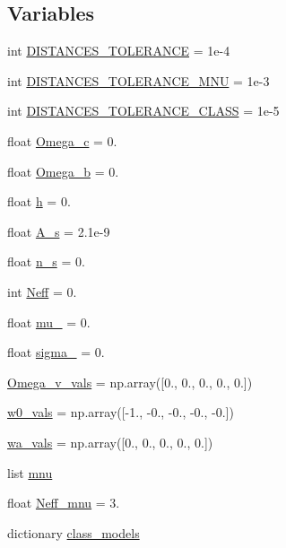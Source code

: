 \subsection*{Variables}
\begin{DoxyCompactItemize}
\item 
int \mbox{\hyperlink{namespaceccl__test__distances_a24d703f3624b8dbed19048286420f986}{D\+I\+S\+T\+A\+N\+C\+E\+S\+\_\+\+T\+O\+L\+E\+R\+A\+N\+CE}} = 1e-\/4
\item 
int \mbox{\hyperlink{namespaceccl__test__distances_a5f8c7c48eb6f00fecddfacef60daece3}{D\+I\+S\+T\+A\+N\+C\+E\+S\+\_\+\+T\+O\+L\+E\+R\+A\+N\+C\+E\+\_\+\+M\+NU}} = 1e-\/3
\item 
int \mbox{\hyperlink{namespaceccl__test__distances_a1ca232f4f29884f49cac06c8238573fd}{D\+I\+S\+T\+A\+N\+C\+E\+S\+\_\+\+T\+O\+L\+E\+R\+A\+N\+C\+E\+\_\+\+C\+L\+A\+SS}} = 1e-\/5
\item 
float \mbox{\hyperlink{namespaceccl__test__distances_af043eb3c72e09eb5d61c07d8ae053b23}{Omega\+\_\+c}} = 0.
\item 
float \mbox{\hyperlink{namespaceccl__test__distances_ab9ebb83b3405642c411447bff8d1cdfa}{Omega\+\_\+b}} = 0.
\item 
float \mbox{\hyperlink{namespaceccl__test__distances_a6657d9200f3deee33876fcfbe909ad0b}{h}} = 0.
\item 
float \mbox{\hyperlink{namespaceccl__test__distances_a4fee99b90c7ad9e42ac56246005f2f99}{A\+\_\+s}} = 2.\+1e-\/9
\item 
float \mbox{\hyperlink{namespaceccl__test__distances_abad4b55ea71dc4c136de2741294d10f3}{n\+\_\+s}} = 0.
\item 
int \mbox{\hyperlink{namespaceccl__test__distances_a23a5c8a12ec37f9ca3d0dc89fe1ae297}{Neff}} = 0.
\item 
float \mbox{\hyperlink{namespaceccl__test__distances_abc8984952fe15413ffa2455954c99084}{mu\+\_}} = 0.
\item 
float \mbox{\hyperlink{namespaceccl__test__distances_a24a6625698e8ac04b4cb42e2eecec798}{sigma\+\_}} = 0.
\item 
\mbox{\hyperlink{namespaceccl__test__distances_a12765193e04eba1a445ea1429b656ef8}{Omega\+\_\+v\+\_\+vals}} = np.\+array(\mbox{[}0., 0., 0., 0., 0.\mbox{]})
\item 
\mbox{\hyperlink{namespaceccl__test__distances_a3cd2fd2656b01e8fa9d3b3b1905570b4}{w0\+\_\+vals}} = np.\+array(\mbox{[}-\/1., -\/0., -\/0., -\/0., -\/0.\mbox{]})
\item 
\mbox{\hyperlink{namespaceccl__test__distances_aa22d23c41d186cbb885841df67b5eaa2}{wa\+\_\+vals}} = np.\+array(\mbox{[}0., 0., 0., 0., 0.\mbox{]})
\item 
list \mbox{\hyperlink{namespaceccl__test__distances_a8e0e0198ea990e29a05cea77a670f0ab}{mnu}}
\item 
float \mbox{\hyperlink{namespaceccl__test__distances_ae8ad2b14dae691b68145cfe94510ef92}{Neff\+\_\+mnu}} = 3.
\item 
dictionary \mbox{\hyperlink{namespaceccl__test__distances_aa4dc8e28781426ffe326155879104cfb}{class\+\_\+models}}
\end{DoxyCompactItemize}


